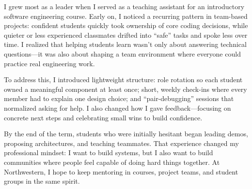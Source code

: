 \documentclass{article}
\begin{document}
\noindent
I grew most as a leader when I served as a teaching assistant for an introductory software engineering course. Early on, I noticed a recurring pattern in team-based projects: confident students quickly took ownership of core coding decisions, while quieter or less experienced classmates drifted into ``safe'' tasks and spoke less over time. I realized that helping students learn wasn't only about answering technical questions---it was also about shaping a team environment where everyone could practice real engineering work.

\par\noindent
To address this, I introduced lightweight structure: role rotation so each student owned a meaningful component at least once; short, weekly check-ins where every member had to explain one design choice; and ``pair-debugging'' sessions that normalized asking for help. I also changed how I gave feedback---focusing on concrete next steps and celebrating small wins to build confidence.

\par\noindent
By the end of the term, students who were initially hesitant began leading demos, proposing architectures, and teaching teammates. That experience changed my professional mindset: I want to build systems, but I also want to build communities where people feel capable of doing hard things together. At Northwestern, I hope to keep mentoring in courses, project teams, and student groups in the same spirit.
\end{document}
